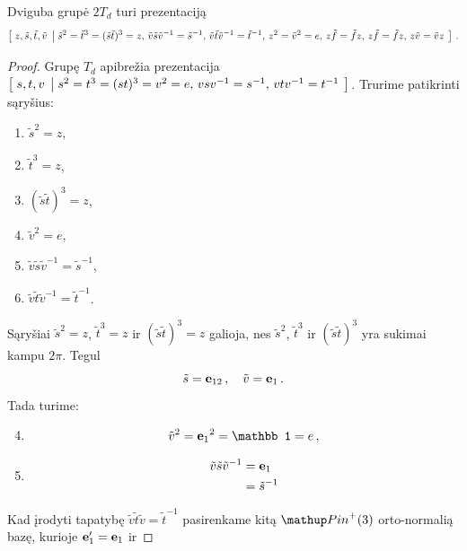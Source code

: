 \begin{proposition}
	Dviguba grupė $2T_d$ turi prezentaciją
	\begin{equation}
		\left[\; z,\tilde s,\tilde t,\tilde v \;\left|\; 
			\tilde s^2=\tilde t^3=(\tilde s\tilde t)^3=z,\,
			\tilde v\tilde s\tilde v^{-1}=\tilde s^{-1},\,
			\tilde v\tilde t\tilde v^{-1}=\tilde t^{-1},\,
			z^2=\tilde v^2=e,\,
			z\tilde f=\tilde fz,\,
			z\tilde f=\tilde fz,\,
			z\tilde v=\tilde vz
		 \;\right.\right]\,.
		\end{equation}
\end{proposition}
\begin{proof}
	Grupę $T_d$ apibrežia prezentacija $\left[\; s,t,v \;\left|\; s^2=t^3=(st)^3=v^2=e,\, vsv^{-1}=s^{-1},\, vtv^{-1}=t^{-1} \;\right.\right]$.
	Trurime patikrinti sąryšius:
	\begin{enumerate}
		\item $\tilde s^2=z$,
		\item $\tilde t^3=z$,
		\item $(\tilde s\tilde t)^3=z$,
		\item $\tilde v^2 = e$,
		\item $\tilde v\tilde s\tilde v^{-1}=\tilde s^{-1}$,
		\item $\tilde v\tilde t\tilde v^{-1}=\tilde t^{-1}$.
	\end{enumerate}
	Sąryšiai $\tilde s^2=z$, $\tilde t^3=z$ ir $(\tilde s\tilde t)^3=z$ galioja,
	nes $\tilde s^2$, $\tilde t^3$ ir $(\tilde s\tilde t)^3$ yra sukimai kampu $2\pi$.
	Tegul 
	\begin{equation}
		\tilde s = \vb e_{12} \,,\quad
		\tilde v = \vb e_1 \,.
	\end{equation}
	Tada turime:
	\begin{enumerate}
			\setcounter{enumi}{3}
		\item 
			\begin{equation}
				\tilde v^2 = {\vb e_1}^2 =\mathbb1 = e
				\,,
			\end{equation}
		\item 
			\begin{equation}
				\begin{aligned}
					\tilde v\tilde s\tilde v^{-1}
					&=\vb e_1
					\\&=\tilde s^{-1}
				\end{aligned}
			\end{equation}
	\end{enumerate}
	Kad įrodyti tapatybę $\tilde v\tilde t\tilde v=\tilde t^{-1}$ pasirenkame kitą $\pinp$ orto-normalią bazę,
	kurioje $\vb e_1' = \vb e_1$ ir  
\end{proof}



